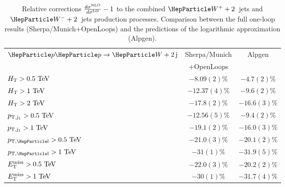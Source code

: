 \documentclass[11pt]{cernrep}
\begin{document}
\begin{table}
\centering
\small{
\begin{tabular}{l|c|c}
\hline
$\Pp\Pp\to\PW+2\,\rm j$ & {\sc Sherpa/Munich}  & {\sc Alpgen}  \\[-1ex]
                          & {\sc +OpenLoops}  &  \\
\hline
\hline
$H_{\rm T}>0.5~\text{TeV}$ & $-8.09(2)\%$  & $-4.7(2)\%$       \\
$H_{\rm T}>1~\text{TeV}$   & $-12.37(4)\%$ & $-9.6(2)\%$      \\
$H_{\rm T}>2~\text{TeV}$   & $-17.8(2)\%$ & $-16.6(3)\%$       \\
\hline
$p_{\rm T,j_1}>0.5~\text{TeV}$  & $-12.56(5)\%$ & $-9.4(2)\%$      \\
$p_{\rm T,j_1}>1~\text{TeV}$    & $-19.1(2)\%$  & $-16.0(3)\%$       \\
\hline
$p_{\rm T,\Pl}>0.5\UTeV$  & $-21.0(3)\%$   &  $-20.1(2)\%$   \\
$p_{\rm T,\Pl}>1\UTeV$    & $-31(1)\%$     &  $-31.9(5)\%$     \\
\hline
$E_{\rm T}^{\rm miss}>0.5~\text{TeV}$  & $-22.0(3)\%$  &  $-20.2(2)\%$   \\
$E_{\rm T}^{\rm miss}>1~\text{TeV}$    & $-30(1)\%$    &  $-31.7(4)\%$     \\
\hline
\end{tabular}
}
\caption{ \label{tabelwtotj} Relative corrections $\frac{d \sigma^{\rm NLO}}{d \sigma^{\rm LO}}-1$ to the combined 
$\PW^++2$~jets and $\PW^-+2$~jets production processes. Comparison between the full one-loop results ({\sc Sherpa/Munich+OpenLoops}) and the 
predictions of the logarithmic approximation ({\sc Alpgen}). }
\end{table}
\end{document}
